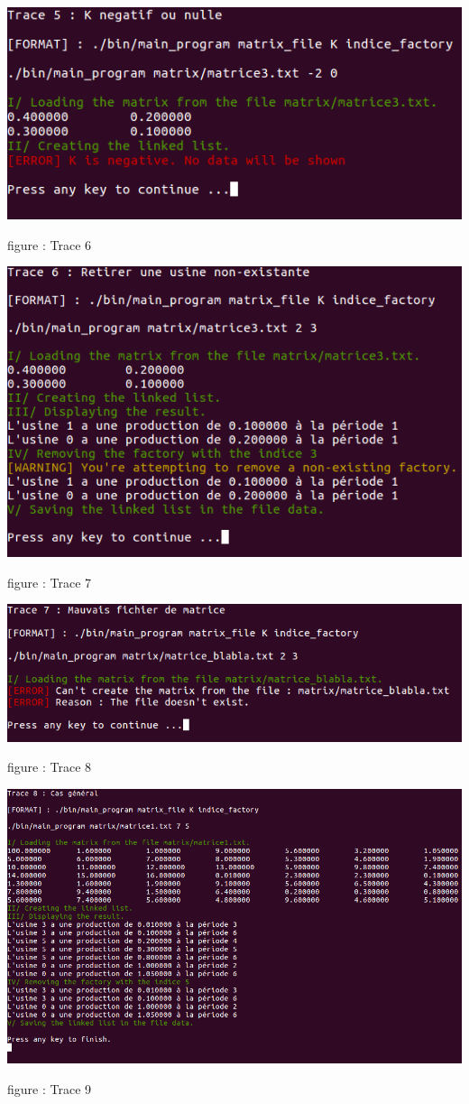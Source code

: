 \documentclass[a4paper]{article}
\begin{document}
\begin{center}
\includegraphics[scale=0.4]{trace_6.png}

figure : Trace 6
\end{center}
\begin{center}
\includegraphics[scale=0.4]{trace_7.png}

figure : Trace 7
\end{center}

\begin{center}
\includegraphics[scale=0.4]{trace_8.png}

figure : Trace 8
\end{center}

\begin{center}
\includegraphics[scale=0.4]{trace_9.png}

figure : Trace 9
\end{center}
\end{document}
